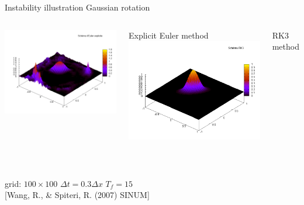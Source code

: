 \documentclass{beamer}
\begin{document}
  \begin{frame}{Instability illustration}
    Gaussian rotation
    \begin{columns}[c]
        \includegraphics[width=\textwidth]{img/rotation_euler.png}

        Explicit Euler method
        \includegraphics[width=\textwidth]{img/rotation_rk3.png}

        RK3 method
    \end{columns}

    \ 

    grid: $100\times 100$ \hfill $\Delta t = 0.3\Delta x$ \hfill $T_f = 15$ \\

    [Wang, R., \& Spiteri, R. (2007) SINUM]
  \end{frame}
\end{document}
